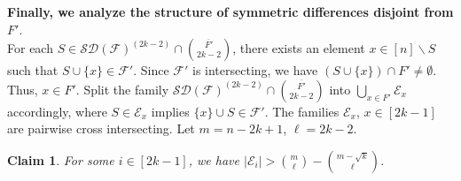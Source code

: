 \documentclass[11pt]{article}
\numberwithin{equation}{section}
\newtheorem{claim}{Claim}[section]
\begin{document}
    
{\bf Finally, we analyze the structure of symmetric differences disjoint from $F'$}.\\

	For each $S\in \mathcal{SD}(\mathcal{F})^{(2k-2)}\cap\binom{\overline{F'}}{2k-2}$, there exists an element  $x\in [n]\backslash S$ such that $S\cup \{x\}\in \mathcal{F}'$. Since $\mathcal{F}'$ is intersecting, we have  $\left( S\cup \{x\} \right)\cap F'\neq \emptyset$. Thus, $x\in F'$.  Split the family $\mathcal{SD}(\mathcal{F})^{(2k-2)} \cap \binom{\overline{F'}}{2k-2}$ into $\bigcup_{x \in F'} \mathcal{E}_x$ accordingly, where $S \in \mathcal{E}_x$ implies $\{x\} \cup S \in \mathcal{F}'$. The families $\mathcal{E}_x$, $x \in [2k-1]$ are pairwise cross intersecting.
	Let $m=n-2k+1$, $\ell=2k-2$.

    
	\begin{claim}\label{cl1}
		For some $i\in [2k-1]$, we have $|\mathcal{E}_i| > \binom{m}{\ell} - \binom{m-\sqrt{k}}{\ell}$.
	\end{claim}
\end{document}
